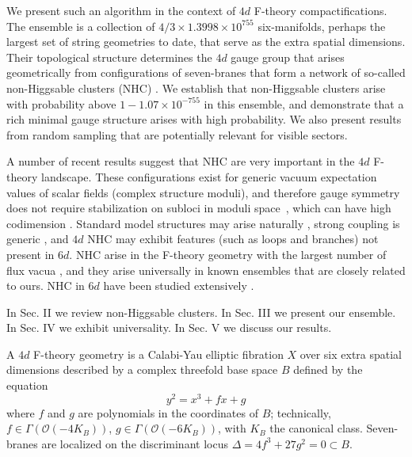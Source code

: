 \documentclass[aps,prl,twocolumn, superscriptaddress,groupedaddress,nofootinbib]{revtex4-1}
\begin{document}
We present such an algorithm in the context of $4d$ F-theory \cite{Vafa:1996xn,*Morrison:1996pp,*Morrison:1996pp}
compactifications. The ensemble is a collection of
$4/3\times 1.3998\times 10^{755}$ six-manifolds, perhaps the largest set
of string geometries to date, that serve as the extra spatial dimensions. Their topological structure determines the $4d$ gauge group that arises 
geometrically from
configurations of seven-branes that form a network of so-called non-Higgsable
clusters (NHC) \cite{Morrison:2012np}. We establish that non-Higgsable clusters arise with
probability above $1-1.07\times 10^{-755}$ in this ensemble, and demonstrate that a rich minimal gauge structure arises with high probability. We also
present results from random sampling that are potentially relevant for
visible sectors.

A number of recent results suggest that NHC are very
important in the $4d$ F-theory landscape. These configurations exist for generic vacuum expectation values of
 scalar fields (complex structure moduli), and therefore
gauge symmetry does not require stabilization on subloci in 
moduli space~\cite{Grassi:2014zxa}, which can have high codimension \cite{Braun:2014xka,*Watari:2015ysa,*Halverson:2016tve}. Standard model structures may arise naturally \cite{Grassi:2014zxa}, strong coupling is generic \cite{Halverson:2016vwx}, and $4d$ NHC may exhibit features \cite{Morrison:2014lca} (such as loops and branches) not present
in $6d$. NHC arise in the F-theory geometry with the largest number of flux
vacua \cite{Taylor:2015xtz}, and they arise universally in known ensembles 
\cite{Halverson:2015jua,*Taylor:2015ppa} that are closely related to ours.
NHC in $6d$ have been studied extensively \cite{Morrison:2012np,Morrison:2012js,*Taylor:2012dr,*Morrison:2014era,*Martini:2014iza,*Johnson:2014xpa,*Taylor:2015isa}.

In Sec. II we review non-Higgsable clusters. In Sec. III we present our ensemble.
In Sec. IV we exhibit universality. In Sec. V we discuss our results.


\vspace{.2cm}
A $4d$ F-theory geometry is a Calabi-Yau elliptic fibration
$X$ over six extra spatial dimensions  described by a complex threefold base space $B$ defined by the equation
\begin{equation}
y^2=x^3+f x + g
\end{equation}
where $f$ and $g$ are polynomials in the coordinates
of $B$;  technically, $f\in \Gamma(\mathcal{O}(-4K_B))$, $g\in \Gamma(\mathcal{O}(-6K_B))$, with $K_B$ the canonical class.
Seven-branes are localized on the discriminant locus
$\Delta=4f^3+27g^2=0\subset B$.
\end{document}

